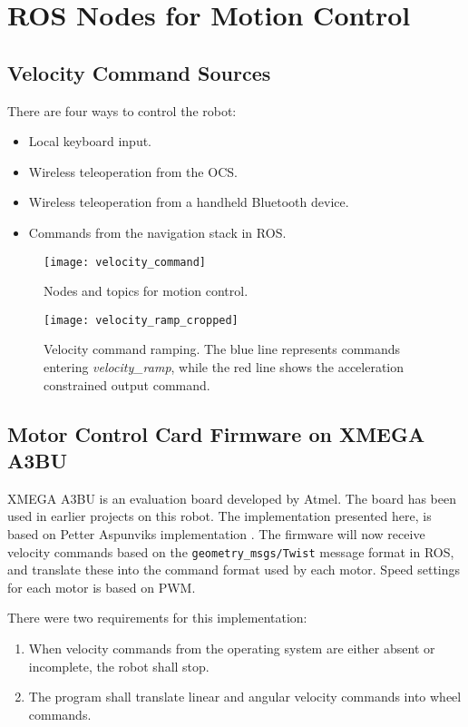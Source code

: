 \section{ROS Nodes for Motion Control}


\subsection{Velocity Command Sources}

There are four ways to control the robot:

\begin{itemize}
	\item Local keyboard input.
	\item Wireless teleoperation from the \ac{OCS}.
	\item Wireless teleoperation from a handheld Bluetooth device.
	\item Commands from the navigation stack in \ac{ROS}.
\end{itemize}

\begin{figure}[p]
	\centering
	\texttt{[image: velocity\_command]}
	\caption{Nodes and topics for motion control. }
	\label{fig:move_base_nodes}
\end{figure}

\begin{figure}[p]
	\centering
	\texttt{[image: velocity\_ramp\_cropped]}
	\caption{Velocity command ramping. The blue line represents commands entering \textit{velocity\_ramp}, while the red line shows the acceleration constrained output command.}
	\label{fig:velocity_ramp}
\end{figure}

\subsection{Motor Control Card Firmware on XMEGA A3BU}

XMEGA A3BU is an evaluation board developed by Atmel. The board has been used in earlier projects on this robot. The implementation presented here, is based on Petter Aspunviks implementation \cite{aspunvik}. The firmware will now receive velocity commands based on the \texttt{geometry\_msgs/Twist} message format in \ac{ROS}, and translate these into the command format used by each motor. Speed settings for each motor is based on \ac{PWM}. 

There were two requirements for this implementation: 
\begin{enumerate}
\item When velocity commands from the operating system are either absent or incomplete, the robot shall stop.
\item The program shall translate linear and angular velocity commands into wheel commands.
\end{enumerate}

